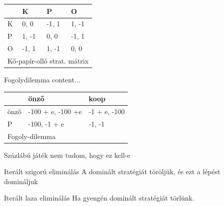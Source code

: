 \begin{center}
\begin{tabular}{llll}
	\hline
	\multicolumn{1}{|l|}{}  & \multicolumn{1}{l|}{K}     & \multicolumn{1}{l|}{P}     & \multicolumn{1}{l|}{O}     \\ \hline
	\multicolumn{1}{|l|}{K} & \multicolumn{1}{l|}{0, 0}  & \multicolumn{1}{l|}{-1, 1} & \multicolumn{1}{l|}{1, -1} \\ \hline
	\multicolumn{1}{|l|}{P} & \multicolumn{1}{l|}{1, -1} & \multicolumn{1}{l|}{0, 0}  & \multicolumn{1}{l|}{-1, 1} \\ \hline
	\multicolumn{1}{|l|}{O} & \multicolumn{1}{l|}{-1, 1} & \multicolumn{1}{l|}{1, -1} & \multicolumn{1}{l|}{0, 0}  \\ \hline
	\multicolumn{4}{l}{Kő-papír-olló strat. mátrix}                                                               
\end{tabular}
\end{center}
	


\begin{definition}{Fogolydilemma}{}
	content...
\end{definition}

\begin{center}
	\begin{tabular}{lll}
		\hline
		\multicolumn{1}{|l|}{}     & \multicolumn{1}{l|}{önző}              & \multicolumn{1}{l|}{koop}         \\ \hline
		\multicolumn{1}{|l|}{önző} & \multicolumn{1}{l|}{-100 + e, -100 +e} & \multicolumn{1}{l|}{-1 + e, -100} \\ \hline
		\multicolumn{1}{|l|}{P}    & \multicolumn{1}{l|}{-100, -1 + e}      & \multicolumn{1}{l|}{-1, -1}       \\ \hline
		\multicolumn{3}{l}{Fogoly-dilemma}                                                                     
	\end{tabular}
\end{center}

\begin{definition}{Százlábú játék}{}
	nem tudom, hogy ez kell-e
\end{definition}

\begin{definition}{Iterált szigorú eliminálás}{}
	A dominált stratégiát töröljük, és ezt a lépést domináljuk
\end{definition}

\begin{definition}{Iterált laza eliminálás}{}
	Ha gyengén dominált stratégiát törlünk.
\end{definition}


